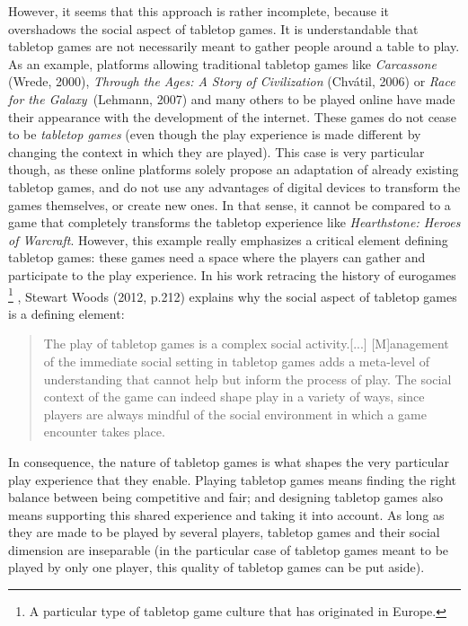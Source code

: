 However, it seems that this approach is rather incomplete, because it overshadows the social aspect of tabletop games. It is understandable that tabletop games are not necessarily meant to gather people around a table to play. As an example, platforms allowing traditional tabletop games like \textit{Carcassone} (Wrede, 2000)\cite{game:carca}, \textit{Through the Ages: A Story of Civilization} (Chvátil, 2006)\cite{game:ages} or \textit{Race for the Galaxy}\ (Lehmann, 2007)\cite{game:race} and many others to be played online have made their appearance with the development of the internet. 
These games do not cease to be \textit{tabletop games} (even though the play experience is made different by changing the context in which they are played). This case is very particular though, as these online platforms solely propose an adaptation of already existing tabletop games, and do not use any advantages of digital devices to transform the games themselves, or create new ones. In that sense, it cannot be compared to a game that completely transforms the tabletop experience like \textit{Hearthstone: Heroes of Warcraft}.  However, this example really emphasizes a critical element defining tabletop games: these games need a space where the players can gather and participate to the play experience. In his work retracing the history of eurogames
\footnote{A particular type of tabletop game culture that has originated in Europe.}
, Stewart Woods (2012, p.212)\cite{book:euro} explains why the social aspect of tabletop games is a defining element:
\begin{quotation}
The play of tabletop games is a complex social activity.[...] [M]anagement of the immediate social setting in tabletop games adds a meta-level of understanding that cannot help but inform the process of play. The social context of the game can indeed shape play in a variety of ways, since players are always mindful of the social environment in which a game encounter takes place.
\end{quotation}
In consequence, the nature of tabletop games is what shapes the very particular play experience that they enable. Playing tabletop games means finding the right balance between being competitive and fair; and designing tabletop games also means supporting this shared experience and taking it into account. As long as they are made to be played by several players, tabletop games and their social dimension are inseparable (in the particular case of tabletop games meant to be played by only one player, this quality of tabletop games can be put aside).
